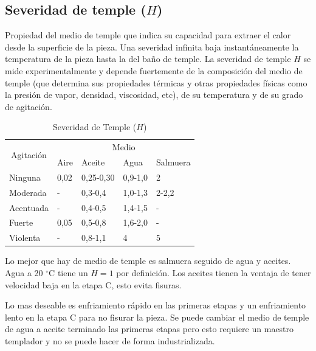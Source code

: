 \documentclass{article}
\newcommand{\grad}{\ensuremath{^\circ \mathrm{C}}}
\begin{document}
\subsection[Severidad de temple]{Severidad de temple ($H$)}
Propiedad del medio de temple que indica su capacidad para extraer el calor desde la superficie de la pieza. Una severidad infinita baja instantáneamente la temperatura de la pieza hasta la del baño de temple. La severidad de temple $H$ se mide experimentalmente y depende fuertemente de la composición del medio de temple (que determina sus propiedades térmicas y otras propiedades físicas como la presión de vapor, densidad, viscosidad, etc), de su temperatura y de su grado de agitación. 


\begin{table}[htb!]
\centering
\begin{tabular}{l|l|l|l|l}
\hline
\multicolumn{1}{c|}{\multirow{2}{*}{Agitación}} & \multicolumn{4}{c}{Medio}            \\ \cline{2-5} 
\multicolumn{1}{c|}{}                           & Aire & Aceite    & Agua    & Salmuera \\ \hline
Ninguna                                         & 0,02 & 0,25-0,30 & 0,9-1,0 & 2        \\
Moderada                                        & -    & 0,3-0,4   & 1,0-1,3 & 2-2,2    \\
Acentuada                                       & -    & 0,4-0,5   & 1,4-1,5 & -        \\
Fuerte                                          & 0,05 & 0,5-0,8   & 1,6-2,0 & -        \\
Violenta                                        & -    & 0,8-1,1   & 4       & 5        \\ \hline
\end{tabular}
\caption{Severidad de Temple ($H$)}
\label{tab:severidadTemple}
\end{table}

Lo mejor que hay de medio de temple es salmuera seguido de agua y aceites. Agua a 20 \grad{} tiene un $H=1$ por definición. Los aceites tienen la ventaja de tener velocidad baja en la etapa C, esto evita fisuras. 

Lo mas deseable es enfriamiento rápido en las primeras etapas y un enfriamiento lento en la etapa C para no fisurar la pieza. Se puede cambiar el medio de temple de agua a aceite terminado las primeras etapas pero esto requiere un maestro templador y no se puede hacer de forma industrializada.
\end{document}
